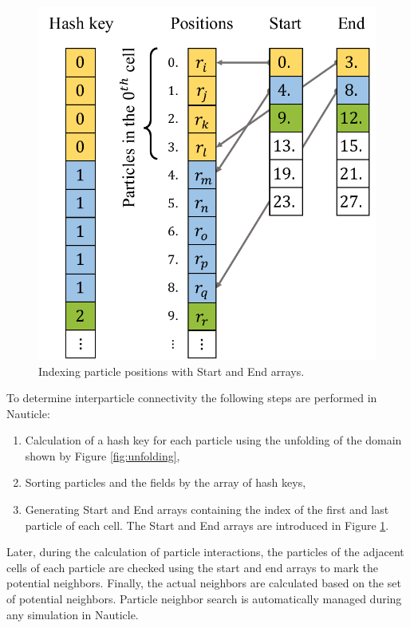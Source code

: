 \documentclass[a4paper,12pt,openany]{book}
\theoremstyle{break}
\begin{document}
\begin{figure}[H]
  \includegraphics[scale=0.6]{nnsearch.pdf}
  \centering
  \caption{Indexing particle positions with Start and End arrays.}
  \label{fig:nnsearch}
\end{figure}\vspace*{3pt}

To determine interparticle connectivity the following steps are performed in Nauticle:
\begin{enumerate}
  \item Calculation of a hash key for each particle using the unfolding of the domain shown by Figure \ref{fig:unfolding},
  \item Sorting particles and the fields by the array of hash keys,
  \item Generating Start and End arrays containing the index of the first and last particle of each cell. The Start and End arrays are introduced in Figure \ref{fig:nnsearch}.
\end{enumerate}
Later, during the calculation of particle interactions, the particles of the adjacent cells of each particle are checked using the start and end arrays to mark the potential neighbors. Finally, the actual neighbors are calculated based on the set of potential neighbors.
Particle neighbor search is automatically managed during any simulation in Nauticle.
\end{document}
